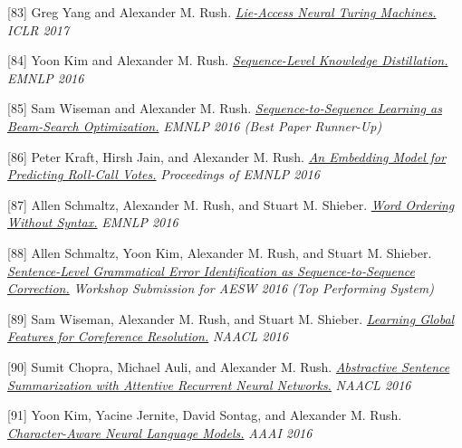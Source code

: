\documentclass[10pt]{article}
\begin{document}
\medskip


[83] \ind Greg Yang and Alexander M. Rush. \emph{\href{ http://lstm.seas.harvard.edu/lantm/ }{ Lie-Access Neural Turing Machines.} }\emph{ ICLR 2017 }

\medskip


[84] \ind Yoon Kim and Alexander M. Rush. \emph{\href{ http://arxiv.org/pdf/1606.07947v1.pdf }{ Sequence-Level Knowledge Distillation.} }\emph{ EMNLP 2016 }

\medskip


[85] \ind Sam Wiseman and Alexander M. Rush. \emph{\href{ http://arxiv.org/pdf/1606.02960.pdf }{ Sequence-to-Sequence Learning as Beam-Search Optimization.} }\emph{ EMNLP 2016 (Best Paper Runner-Up) }

\medskip


[86] \ind Peter Kraft, Hirsh Jain, and Alexander M. Rush. \emph{\href{ https://www.aclweb.org/anthology/D/D16/D16-1221.pdf }{ An Embedding Model for Predicting Roll-Call Votes.} }\emph{ Proceedings of EMNLP 2016 }

\medskip


[87] \ind Allen Schmaltz, Alexander M. Rush, and Stuart M. Shieber. \emph{\href{ https://arxiv.org/abs/1604.08633 }{ Word Ordering Without Syntax.} }\emph{ EMNLP 2016 }

\medskip


[88] \ind Allen Schmaltz, Yoon Kim, Alexander M. Rush, and Stuart M. Shieber. \emph{\href{ /papers/aesw2016.pdf }{ Sentence-Level Grammatical Error Identification as Sequence-to-Sequence Correction.} }\emph{ Workshop Submission for AESW 2016 (Top Performing System) }

\medskip


[89] \ind Sam Wiseman, Alexander M. Rush, and Stuart M. Shieber. \emph{\href{ /papers/corefmain.pdf }{ Learning Global Features for Coreference Resolution.} }\emph{ NAACL 2016 }

\medskip


[90] \ind Sumit Chopra, Michael Auli, and Alexander M. Rush. \emph{\href{ /papers/naacl16_summary.pdf }{ Abstractive Sentence Summarization with Attentive Recurrent Neural Networks.} }\emph{ NAACL 2016 }

\medskip


[91] \ind Yoon Kim, Yacine Jernite, David Sontag, and Alexander M. Rush. \emph{\href{ https://arxiv.org/pdf/1508.06615v4 }{ Character-Aware Neural Language Models.} }\emph{ AAAI 2016 }

\medskip
\end{document}
